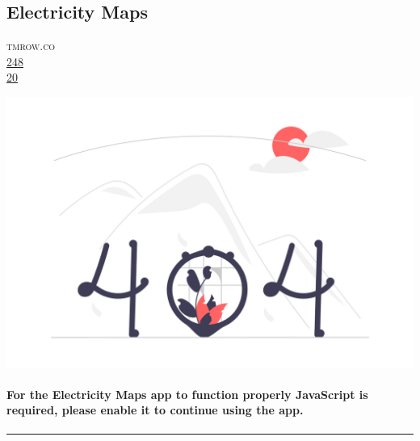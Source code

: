 \documentclass[10pt,a4paper]{article}
\begin{document}
\subsection{Electricity Maps}
\noindent\begin{minipage}[t]{0.20\linewidth}
\vspace{0pt}
\noindent\textsc{\footnotesize
{\scriptsize\faGlobe}\space 
tmrow.co \\
{\scriptsize\faThumbsOUp}\space 
\href{http://news.ycombinator.com/item?id=37197903\&utm\_term=comment}{248} \\
{\scriptsize\faComments}\space 
\href{http://news.ycombinator.com/item?id=37197903\&utm\_term=comment}{20} \\
}
\end{minipage} 
\begin{minipage}[t]{0.80\linewidth}
\vspace{0pt}
\begin{multicols}{2}

    \href{https://app.electricitymaps.com?utm\_source=hackernewsletter\&utm\_medium=email\&utm\_term=fav}{
        \includegraphics[width=0.99\linewidth]{notfound.png}
    }
  
\paragraph{For the Electricity Maps app to function properly JavaScript is required, please enable it to continue using the app.}


\end{multicols}
\end{minipage}
\par\medskip
\noindent\textcolor{red}{\rule{\linewidth}{0.2mm}}
\end{document}
